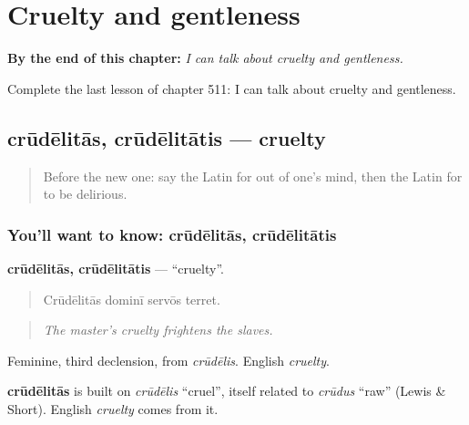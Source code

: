 
\chapter{Cruelty and gentleness}
\label{ch:la-cruelty-and-gentleness}

\begin{chapteropening}
\textbf{By the end of this chapter:} \emph{I can talk about cruelty and gentleness.}

Complete the last lesson of chapter 511: I can talk about cruelty and gentleness.
\end{chapteropening}

\section[crūdēlitās, crūdēlitātis]{crūdēlitās, crūdēlitātis — cruelty}

\label{lesson:LA-C511-crudelitas}



\begin{quote}
Before the new one: say the Latin for out of one's mind, then the Latin for to be delirious.
\end{quote}

\subsection*{You'll want to know: crūdēlitās, crūdēlitātis}
\textbf{crūdēlitās, crūdēlitātis} — \textquotedblleft{}cruelty\textquotedblright{}.

\begin{quote}
Crūdēlitās dominī servōs terret.
\end{quote}

\begin{quote}
\emph{The master's cruelty frightens the slaves.}
\end{quote}

Feminine, third declension, from \emph{crūdēlis}. English \emph{cruelty}.

\begin{cousinweb}
\textbf{crūdēlitās} is built on \emph{crūdēlis} \textquotedblleft{}cruel\textquotedblright{}, itself related to \emph{crūdus} \textquotedblleft{}raw\textquotedblright{} (Lewis \& Short). English \emph{cruelty} comes from it.
\end{cousinweb}

